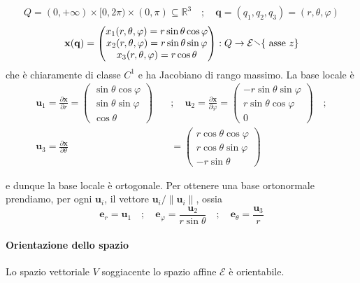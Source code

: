 \begin{example}
    \[
        Q = {(0, +\infty)} \times [0, 2\pi) \times (0, \pi) \subseteq
        \mathbb{R}^3 \quad ; \quad \mathbf{q} = {(q_1, q_2, q_3)} = {(r, \theta,
        \varphi)}
    \]
    \[
      \mathbf{x} {(\mathbf{q} )} = \begin{pmatrix}
          x_{1}{(r, \theta, \varphi)} = r \sin \theta \cos \varphi  \\
          x_{2}{(r, \theta, \varphi)} = r \sin \theta \sin \varphi  \\
          x_{3}{(r, \theta, \varphi)} = r \cos \theta
      \end{pmatrix} : Q \to \mathcal{E} \sminus \{\text{ asse \(z\)}\} 
    \]
    che è chiaramente di classe \(C^{1}\) e ha Jacobiano di rango massimo. La
    base locale è
    \begin{align*}
      \mathbf{u}_1 = \frac{\partial \mathbf{x} }{\partial r} = \begin{pmatrix}
          \sin \theta \cos \varphi \\
          \sin \theta \sin \varphi \\
          \cos \theta
          \end{pmatrix} \quad &; \quad \mathbf{u}_2 = \frac{\partial \mathbf{x}
          }{\partial \varphi } = \begin{pmatrix}
          - r \sin \theta \sin \varphi \\
          r \sin \theta \cos \varphi \\
          0
      \end{pmatrix} \quad ; \\ \mathbf{u}_3 = \frac{\partial \mathbf{x}
      }{\partial \theta} &= \begin{pmatrix}
          r \cos \theta \cos \varphi \\
          r \cos \theta \sin \varphi \\
          -r\sin \theta
      \end{pmatrix}
    \end{align*}

    e dunque la base locale è ortogonale. Per ottenere una base ortonormale
    prendiamo, per ogni \(\mathbf{u} _{i}\), il vettore \(\mathbf{u}_i /
    \|\mathbf{u} _i\|\), ossia
    \[
      \mathbf{e}_r = \mathbf{u}_1 \quad ; \quad \mathbf{e}_\varphi =
      \frac{\mathbf{u}_2}{r \sin\theta} \quad ;  \quad \mathbf{e}_\theta =
      \frac{\mathbf{u}_3}{r}
    \]
\end{example}
\paragraph{Orientazione dello spazio}
Lo spazio vettoriale \(V\) soggiacente lo spazio affine \(\mathcal{E}\) è
orientabile.

